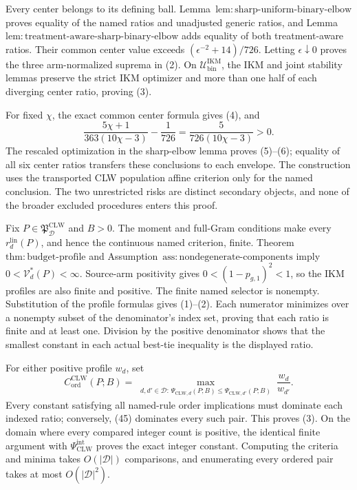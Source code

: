 Every center belongs to its defining ball.  Lemma~\(\mathrm{lem{:}sharp\text{-}uniform\text{-}binary\text{-}elbow}\) proves equality of the named ratios and unadjusted generic ratios, and Lemma~\(\mathrm{lem{:}treatment\text{-}aware\text{-}sharp\text{-}binary\text{-}elbow}\) adds equality of both treatment-aware ratios.  Their common center value exceeds \((\epsilon^{-2}+14)/726\).  Letting \(\epsilon\downarrow0\) proves the three arm-normalized suprema in (2).  On \(\mathcal U_{\mathrm{bin}}^{\mathrm{IKM}}\), the IKM and joint stability lemmas preserve the strict IKM optimizer and more than one half of each diverging center ratio, proving (3).

For fixed \(\chi\), the exact common center formula gives (4), and
\[
 \frac{5\chi+1}{363(10\chi-3)}-\frac1{726}
 =\frac5{726(10\chi-3)}>0.                                \tag{44}
\]
The rescaled optimization in the sharp-elbow lemma proves (5)--(6); equality of all six center ratios transfers these conclusions to each envelope.  The construction uses the transported CLW population affine criterion only for the named conclusion.  The two unrestricted risks are distinct secondary objects, and none of the broader excluded procedures enters this proof.

Fix \(P\in\mathfrak P_{\mathcal D}^{\mathrm{CLW}}\) and \(B>0\).  The moment and full-Gram conditions make every \(r_d^{\mathrm{lin}}(P)\), and hence the continuous named criterion, finite.  Theorem~\(\mathrm{thm{:}budget\text{-}profile}\) and Assumption~\(\mathrm{ass{:}nondegenerate\text{-}components}\) imply \(0<\mathcal V_d^*(P)<\infty\).  Source-arm positivity gives \(0<(1-p_{g,1})^2<1\), so the IKM profiles are also finite and positive.  The finite named selector is nonempty.  Substitution of the profile formulas gives (1)--(2).  Each numerator minimizes over a nonempty subset of the denominator's index set, proving that each ratio is finite and at least one.  Division by the positive denominator shows that the smallest constant in each actual best-tie inequality is the displayed ratio.

For either positive profile \(w_d\), set
\[
 C_{\mathrm{ord}}^{\mathrm{CLW}}(P;B)
 =\max_{\substack{d,d'\in\mathcal D:\,
 \Psi_{\mathrm{CLW},d}(P;B)
 \le\Psi_{\mathrm{CLW},d'}(P;B)}}\frac{w_d}{w_{d'}}.       \tag{45}
\]
Every constant satisfying all named-rule order implications must dominate each indexed ratio; conversely, (45) dominates every such pair.  This proves (3).  On the domain where every compared integer count is positive, the identical finite argument with \(\Psi_{\mathrm{CLW}}^{\mathrm{int}}\) proves the exact integer constant.  Computing the criteria and minima takes \(O(|\mathcal D|)\) comparisons, and enumerating every ordered pair takes at most \(O(|\mathcal D|^2)\).

